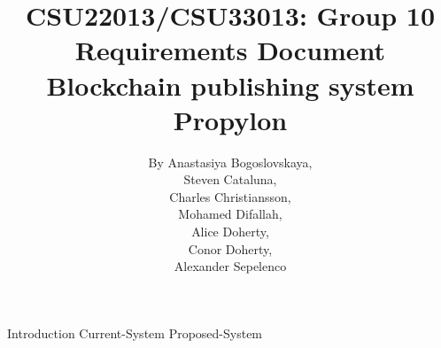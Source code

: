 \documentclass{article}
\title{
	{CSU22013/CSU33013: Group 10}\\
	{Requirements Document}\\
	{Blockchain publishing system}\\
	{\large Propylon}
}
\author{
	{By Anastasiya Bogoslovskaya,}\\
	{Steven Cataluna,} \\
	{Charles Christiansson,} \\
    {Mohamed Difallah,} \\
	{Alice Doherty,} \\
	{Conor Doherty,} \\
	{Alexander Sepelenco}
}
\date{} %
\begin{document}

\maketitle %
\tableofcontents %

{Introduction} 
{Current-System}
{Proposed-System}
\end{document}
